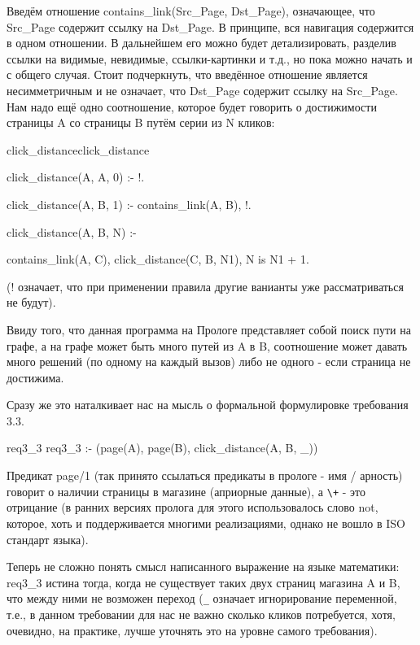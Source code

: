 \documentclass[a4paper]{book}
\def\td{т.\thinspace д.}
\def\te{т.\thinspace е.}
\begin{document}
Введём отношение contains_link(Src_Page, Dst_Page),
означающее, что Src_Page содержит ссылку на Dst_Page. В
принципе, вся навигация содержится в одном отношении. В
дальнейшем его можно будет детализировать, разделив ссылки на
видимые, невидимые, ссылки-картинки и \td, но пока можно начать
и с общего случая. Стоит подчеркнуть, что введённое отношение
является несимметричным и не означает, что Dst_Page содержит
ссылку на Src_Page. Нам надо ещё одно соотношение, которое будет
говорить о достижимости страницы A со страницы B путём серии из N
кликов:

\begin{example}{click_distance}{click_distance}

click_distance(A, A, 0) :- !.

click_distance(A, B, 1) :- contains_link(A, B), !.

click_distance(A, B, N) :-

                  contains_link(A, C),
                  click_distance(C, B, N1),
                  N is N1 + 1.
\end{example}

(! означает, что при применении правила другие ванианты уже
рассматриваться не будут).

Ввиду того, что данная программа на Прологе представляет собой
поиск пути на графе, а на графе может быть много путей из A в B,
соотношение может давать много решений (по одному на каждый
вызов) либо не одного - если страница не достижима.

Сразу же это наталкивает нас на мысль о формальной формулировке
требования 3.3.

\begin{example}{req3_3}{}
req3_3 :- \+ (page(A), page(B), \+ click_distance(A, B, _))
\end{example}

Предикат page/1 (так принято ссылаться предикаты в прологе - имя
/ арность) говорит о наличии страницы в магазине (априорные
данные), а \verb|\+| - это отрицание (в ранних версиях пролога
для этого использовалось слово not, которое, хоть и
поддерживается многими реализациями, однако не вошло в ISO
стандарт языка).

Теперь не сложно понять смысл написанного выражение на языке
математики: req3_3 истина тогда, когда не существует таких двух
страниц магазина A и B, что между ними не возможен переход
(\verb|_| означает игнорирование переменной, \te, в данном
требовании для нас не важно сколько кликов потребуется, хотя,
очевидно, на практике, лучше уточнять это на уровне самого
требования).
\end{document}
